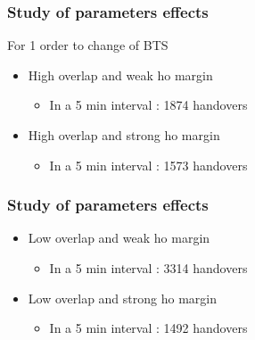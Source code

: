 \documentclass{beamer}
\begin{document}
\begin{frame}
\frametitle{Study of parameters effects}
For 1 order to change of BTS
\begin{itemize}
 \item High overlap and weak ho margin
  \begin{itemize}
    \item In a 5 min interval : 1874 handovers
  \end{itemize}
 \item High overlap and strong ho margin
  \begin{itemize}
    \item In a 5 min interval : 1573 handovers
  \end{itemize}
\end{itemize}
\end{frame}
\begin{frame}
\frametitle{Study of parameters effects}
\begin{itemize}
 \item Low overlap and weak ho margin
  \begin{itemize}
    \item In a 5 min interval : 3314 handovers
  \end{itemize}
 \item Low overlap and strong ho margin
  \begin{itemize}
    \item In a 5 min interval : 1492 handovers
  \end{itemize}
\end{itemize}
\end{frame}
\end{document}
